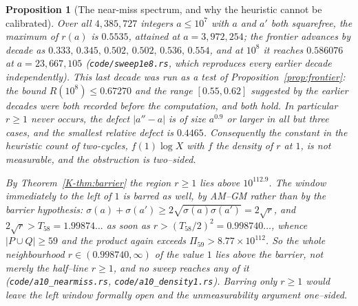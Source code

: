 \documentclass[11pt]{article}
\newtheorem{proposition}[theorem]{Proposition}
\theoremstyle{definition}
\begin{document}
\begin{proposition}[The near-miss spectrum, and why the heuristic cannot be calibrated]\label{prop:nearmiss}
Over all $4{,}385{,}727$ integers $a\le10^7$ with $a$ and $a'$ both squarefree, the maximum of
$r(a)$ is $0.5535$, attained at $a=3{,}972{,}254$; the frontier advances by decade as
$0.333,\,0.345,\,0.502,\,0.502,\,0.536,\,0.554$, and at $10^{8}$ it reaches $0.586076$ at
$a=23{,}667{,}105$ \textup{(\texttt{code/sweep1e8.rs}, which reproduces every earlier decade
independently)}. This last decade was run as a test of Proposition~\ref{prop:frontier}: the bound
$R(10^{8})\le0.67270$ and the range $[0.55,0.62]$ suggested by the earlier decades were both
recorded before the computation, and both hold. In particular $r\ge1$ never occurs, the defect
$|a''-a|$ is of size $a^{0.9}$ or larger in all but three cases, and the smallest relative defect is
$0.4465$. Consequently the constant in the heuristic count of two-cycles, $f(1)\log X$ with $f$ the
density of $r$ at $1$, is \emph{not measurable}, and the obstruction is two--sided.

By Theorem~\textup{\ref{K-thm:barrier}} the region $r\ge1$ lies above $10^{112.9}$. The window
immediately to the \emph{left} of $1$ is barred as well, by AM--GM rather than by the barrier
hypothesis: $\sigma(a)+\sigma(a')\ge2\sqrt{\sigma(a)\sigma(a')}=2\sqrt r$, and
$2\sqrt r>T_{58}=1.99874\ldots$ as soon as $r>(T_{58}/2)^2=0.998740\ldots$, whence $|P\cup Q|\ge59$
and the product again exceeds $\Pi_{59}>8.77\times10^{112}$. So the whole neighbourhood
$r\in(0.998740,\infty)$ of the value $1$ lies above the barrier, not merely the half--line $r\ge1$,
and no sweep reaches any of it \textup{(\texttt{code/a10\_nearmiss.rs},
\texttt{code/a10\_density1.rs})}. Barring only $r\ge1$ would leave the left window formally open and the unmeasurability argument one--sided.
\end{proposition}
\end{document}

